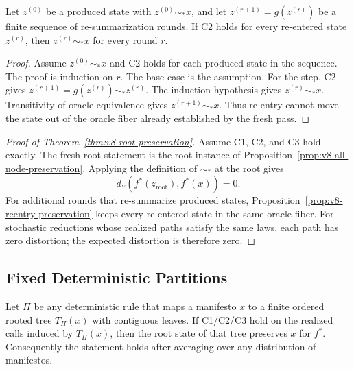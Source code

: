 \begin{proposition}
\label{prop:v8-reentry-preservation}
Let \(z^{(0)}\) be a produced state with \(z^{(0)}\sim_\ast x\), and
let \(z^{(r+1)}=g(z^{(r)})\) be a finite sequence of re-summarization
rounds. If C2 holds for every re-entered state \(z^{(r)}\), then
\(z^{(r)}\sim_\ast x\) for every round \(r\).
\end{proposition}

\begin{proof}
Assume \(z^{(0)}\sim_\ast x\) and C2 holds for each produced state in
the sequence. The proof is induction on \(r\). The base case is the
assumption. For the step, C2 gives
\(z^{(r+1)}=g(z^{(r)})\sim_\ast z^{(r)}\). The induction hypothesis
gives \(z^{(r)}\sim_\ast x\). Transitivity of oracle equivalence gives
\(z^{(r+1)}\sim_\ast x\). Thus re-entry cannot move the state out of
the oracle fiber already established by the fresh pass.
\end{proof}

\begin{proof}[Proof of Theorem~\ref{thm:v8-root-preservation}]
Assume C1, C2, and C3 hold exactly. The fresh root statement is the
root instance of Proposition~\ref{prop:v8-all-node-preservation}.
Applying the definition of \(\sim_\ast\) at the root gives
\[
  d_Y\!\left(f^\ast(z_{\mathrm{root}}),f^\ast(x)\right)=0 .
\]
For additional rounds that re-summarize produced states,
Proposition~\ref{prop:v8-reentry-preservation} keeps every re-entered
state in the same oracle fiber. For stochastic reductions whose
realized paths satisfy the same laws, each path has zero distortion;
the expected distortion is therefore zero.
\end{proof}

\subsection{Fixed Deterministic Partitions}
\label{app:v8-fixed-partition}

\begin{proposition}
\label{prop:v8-fixed-partition}
Let \(\Pi\) be any deterministic rule that maps a manifesto \(x\) to a finite
ordered rooted tree \(T_\Pi(x)\) with contiguous leaves. If C1/C2/C3 hold on
the realized calls induced by \(T_\Pi(x)\), then the root state of that tree
preserves \(x\) for \(f^\ast\). Consequently the statement holds after
averaging over any distribution of manifestos.
\end{proposition}

